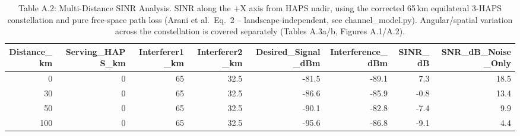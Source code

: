 \begin{table}[H]
\centering
\small
\begin{tabular}{rrrrrrrr}
\toprule
Distance_km & Serving_HAPS_km & Interferer1_km & Interferer2_km & Desired_Signal_dBm & Interference_dBm & SINR_dB & SNR_dB_Noise_Only \\
\midrule
0 & 0 & 65 & 32.5 & -81.5 & -89.1 & 7.3 & 18.5 \\
30 & 0 & 65 & 32.5 & -86.6 & -85.9 & -0.8 & 13.4 \\
50 & 0 & 65 & 32.5 & -90.1 & -82.8 & -7.4 & 9.9 \\
100 & 0 & 65 & 32.5 & -95.6 & -86.8 & -9.1 & 4.4 \\
\bottomrule
\end{tabular}

\caption{Table A.2: Multi-Distance SINR Analysis. SINR along the +X axis from HAPS nadir, using the corrected 65\,km equilateral 3-HAPS constellation and pure free-space path loss (Arani et al.\ Eq.\ 2 -- landscape-independent, see channel\_model.py). Angular/spatial variation across the constellation is covered separately (Tables A.3a/b, Figures A.1/A.2).}
\label{table:app-sinr-multinode-distances}
\end{table}

